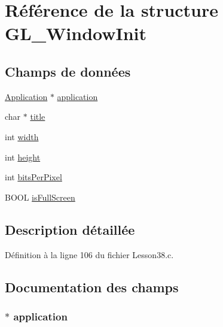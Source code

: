 \hypertarget{struct_g_l___window_init}{}\section{Référence de la structure G\+L\+\_\+\+Window\+Init}
\label{struct_g_l___window_init}
\subsection*{Champs de données}
\begin{DoxyCompactItemize}
\item 
\hyperlink{struct_application}{Application} $\ast$ \hyperlink{struct_g_l___window_init_a404a7a83835a6940936e5171103571aa}{application}
\item 
char $\ast$ \hyperlink{struct_g_l___window_init_af06d911bb9e05f491ef3da520d03796c}{title}
\item 
int \hyperlink{struct_g_l___window_init_a2474a5474cbff19523a51eb1de01cda4}{width}
\item 
int \hyperlink{struct_g_l___window_init_ad12fc34ce789bce6c8a05d8a17138534}{height}
\item 
int \hyperlink{struct_g_l___window_init_afd58fbbba1e33d7cf243b2ee855ed628}{bits\+Per\+Pixel}
\item 
B\+O\+OL \hyperlink{struct_g_l___window_init_ac439e465e74e3c5ebfa70c647a78aded}{is\+Full\+Screen}
\end{DoxyCompactItemize}


\subsection{Description détaillée}


Définition à la ligne 106 du fichier Lesson38.\+c.



\subsection{Documentation des champs}
\subsubsection[{\texorpdfstring{application}{application}}]{$\ast$ application}\hypertarget{struct_g_l___window_init_a404a7a83835a6940936e5171103571aa}{}\label{struct_g_l___window_init_a404a7a83835a6940936e5171103571aa}


